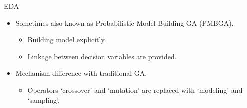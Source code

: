 \begin{frame}{EDA}
  \begin{itemize}
    \item Sometimes also known as Probabilistic Model Building GA (PMBGA).\pause
      \begin{itemize}
        \item Building model explicitly.
        \item Linkage between decision variables are provided.\pause
      \end{itemize}
      \vspace*{14pt}
    \item Mechanism difference with traditional GA.
      \begin{itemize}
        \item Operators `crossover' and `mutation' are replaced with
          `modeling' and `sampling'.        \pause
          \begin{figure}
            \centering
          \end{figure}
      \end{itemize}
  \end{itemize}
\end{frame}

